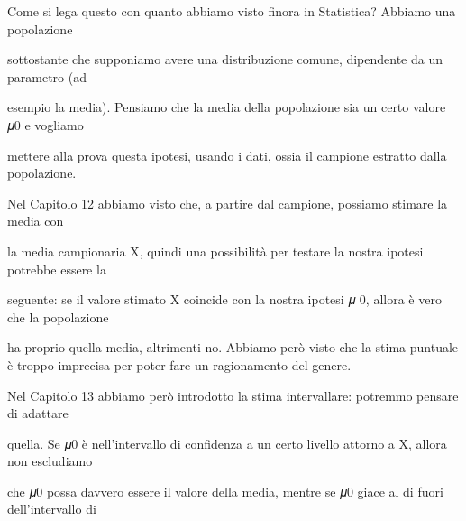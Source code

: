 \documentclass[a4paper,portrait,12pt]{article}
\begin{document}
\begin{flushleft}
Come si lega questo con quanto abbiamo visto finora in Statistica? Abbiamo una popolazione
\end{flushleft}


\begin{flushleft}
sottostante che supponiamo avere una distribuzione comune, dipendente da un parametro (ad
\end{flushleft}


\begin{flushleft}
esempio la media). Pensiamo che la media della popolazione sia un certo valore 𝜇0 e vogliamo
\end{flushleft}


\begin{flushleft}
mettere alla prova questa ipotesi, usando i dati, ossia il campione estratto dalla popolazione.
\end{flushleft}


\begin{flushleft}
Nel Capitolo 12 abbiamo visto che, a partire dal campione, possiamo stimare la media con
\end{flushleft}


\begin{flushleft}
la media campionaria X, quindi una possibilit\`{a} per testare la nostra ipotesi potrebbe essere la
\end{flushleft}


\begin{flushleft}
seguente: se il valore stimato X coincide con la nostra ipotesi 𝜇 0, allora \`{e} vero che la popolazione
\end{flushleft}


\begin{flushleft}
ha proprio quella media, altrimenti no. Abbiamo per\`{o} visto che la stima puntuale \`{e} troppo imprecisa per poter fare un ragionamento del genere.
\end{flushleft}


\begin{flushleft}
Nel Capitolo 13 abbiamo per\`{o} introdotto la stima intervallare: potremmo pensare di adattare
\end{flushleft}


\begin{flushleft}
quella. Se 𝜇0 \`{e} nell'intervallo di confidenza a un certo livello attorno a X, allora non escludiamo
\end{flushleft}


\begin{flushleft}
che 𝜇0 possa davvero essere il valore della media, mentre se 𝜇0 giace al di fuori dell'intervallo di
\end{flushleft}
\end{document}
